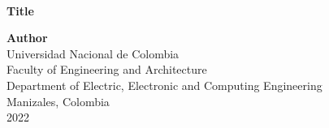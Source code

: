 
\begin{center}

    \begin{figure} \centering
        \\[1.8cm]
    \end{figure}
    
    \thispagestyle{empty}
    
    \begin{spacing}{1.9} 
        \textbf{\huge Title}\\[2cm]
    \end{spacing}
    
    \Large
        \textbf{Author}\\[3cm]
        
    \small 
        Universidad Nacional de Colombia\\
        Faculty of Engineering and Architecture\\ 
        Department of Electric, Electronic and Computing Engineering\\
        Manizales, Colombia\\
        2022\\
    
\end{center}

\newpage{\pagestyle{empty}\cleardoublepage}
\newpage

